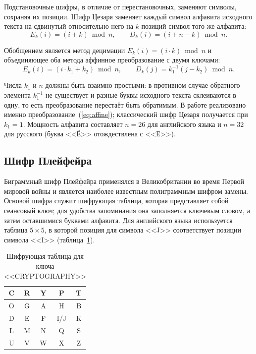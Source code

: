 \documentclass[14pt,a4paper]{extarticle}
\begin{document}
Подстановочные шифры, в отличие от перестановочных, заменяют символы, сохраняя их
позиции. Шифр Цезаря заменяет каждый символ алфавита исходного текста на сдвинутый
относительно него на $k$ позиций символ того же алфавита:
\begin{equation}
E_k(i) = (i + k) \bmod n, \qquad D_k(i) = (i + n - k) \bmod n.
\end{equation}

Обобщением является метод децимации $E_k(i) = (i \cdot k) \bmod n$ и объединяющее оба
метода аффинное преобразование с двумя ключами:
\begin{equation}
E_k(i) = (i \cdot k_1 + k_2) \bmod n, \qquad
D_k(j) = k_1^{-1} (j - k_2) \bmod n.
\label{eq:affine}
\end{equation}

Числа $k_1$ и $n$ должны быть взаимно простыми: в противном случае обратного элемента
$k_1^{-1}$ не существует и разные буквы исходного текста склеиваются в одну, то есть
преобразование перестаёт быть обратимым. В работе реализовано именно
преобразование~(\ref{eq:affine}); классический шифр Цезаря получается при $k_1 = 1$.
Мощность алфавита составляет $n = 26$ для английского языка и $n = 32$ для русского
(буква <<Ё>> отождествлена с <<Е>>).

\subsection{Шифр Плейфейра}

Биграммный шифр Плейфейра применялся в Великобритании во время Первой мировой войны и
является наиболее известным полиграммным шифром замены. Основой шифра служит шифрующая
таблица, которая представляет собой сеансовый ключ; для удобства запоминания она
заполняется ключевым словом, а затем оставшимися буквами алфавита. Для английского
языка используется таблица $5 \times 5$, в которой позиция для символа <<J>>
соответствует позиции символа <<I>> (таблица~\ref{tab:playfair}).

\begin{table}[H]
\caption{Шифрующая таблица для ключа <<CRYPTOGRAPHY>>}
\label{tab:playfair}
\centering
\begin{tabular}{|c|c|c|c|c|}
\hline
C & R & Y & P & T \\ \hline
O & G & A & H & B \\ \hline
D & E & F & I/J & K \\ \hline
L & M & N & Q & S \\ \hline
U & V & W & X & Z \\ \hline
\end{tabular}
\end{table}
\end{document}
